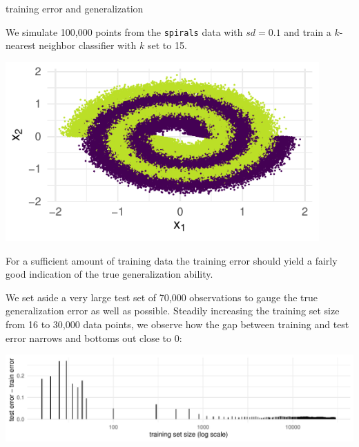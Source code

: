 \documentclass[11pt,compress,t,notes=noshow, xcolor=table]{beamer}
\begin{document}
\begin{vbframe}{training error and generalization}

\begin{minipage}[c]{0.6\textwidth}
  \small
  We simulate 100,000 points from the \texttt{spirals} data with $sd = 0.1$ and 
  train a $k$-nearest neighbor classifier with $k$ set to 15.
\end{minipage}%
\begin{minipage}[c]{0.05\textwidth}
  \phantom{foo}
\end{minipage}%
\begin{minipage}[c]{0.35\textwidth}
  \includegraphics[width = 0.9\textwidth]{figure/eval_delta_train_test_err_data}
\end{minipage}%

\vfill

\small

For a sufficient amount of training data the training error should yield a 
fairly good indication of the true generalization ability.

\vfill

We set aside a very large test set of 70,000 observations to gauge the true 
generalization error as well as possible.
Steadily increasing the training set size from 16 to 30,000 data points, we 
observe how the gap between training and test error narrows and bottoms 
out close to 0:

\vfill

\includegraphics[width = \textwidth]{figure/eval_delta_train_test_err}


\end{vbframe}
\end{document}
